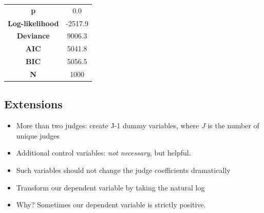 \documentclass[12pt,twoside]{article}
\providecommand{\tightlist}{%
  \setlength{\itemsep}{0pt}\setlength{\parskip}{0pt}}
\begin{document}
\begin{longtable}[c]{@{}cc@{}}
\begin{minipage}[t]{0.27\columnwidth}\centering\strut
\textbf{p}
\strut\end{minipage} &
\begin{minipage}[t]{0.13\columnwidth}\centering\strut
0.0
\strut\end{minipage}\tabularnewline
\begin{minipage}[t]{0.27\columnwidth}\centering\strut
\textbf{Log-likelihood}
\strut\end{minipage} &
\begin{minipage}[t]{0.13\columnwidth}\centering\strut
-2517.9
\strut\end{minipage}\tabularnewline
\begin{minipage}[t]{0.27\columnwidth}\centering\strut
\textbf{Deviance}
\strut\end{minipage} &
\begin{minipage}[t]{0.13\columnwidth}\centering\strut
9006.3
\strut\end{minipage}\tabularnewline
\begin{minipage}[t]{0.27\columnwidth}\centering\strut
\textbf{AIC}
\strut\end{minipage} &
\begin{minipage}[t]{0.13\columnwidth}\centering\strut
5041.8
\strut\end{minipage}\tabularnewline
\begin{minipage}[t]{0.27\columnwidth}\centering\strut
\textbf{BIC}
\strut\end{minipage} &
\begin{minipage}[t]{0.13\columnwidth}\centering\strut
5056.5
\strut\end{minipage}\tabularnewline
\begin{minipage}[t]{0.27\columnwidth}\centering\strut
\textbf{N}
\strut\end{minipage} &
\begin{minipage}[t]{0.13\columnwidth}\centering\strut
1000
\strut\end{minipage}\tabularnewline
\bottomrule
\end{longtable}

\subsection{Extensions}\label{extensions}

\begin{itemize}
\tightlist
\item
  More than two judges: create J-1 dummy variables, where \(J\) is the
  number of unique judges
\item
  Additional control variables: \emph{not necessary}, but helpful.
\item
  Such variables should not change the judge coefficients dramatically
\item
  Transform our dependent variable by taking the natural log
\item
  Why? Sometimes our dependent variable is strictly positive.
\end{itemize}
\end{document}
